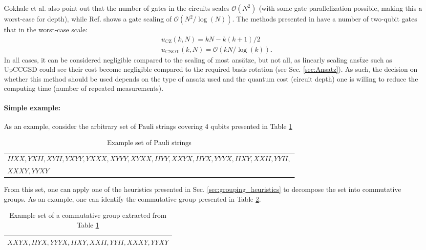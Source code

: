 Gokhale et al. \cite{Gokhale2019_long} also point out that the number of gates in the circuits scales $\mathcal{O}(N^2)$ (with some gate parallelization possible, making this a worst-case for depth), while Ref. \cite{Yen2020} shows a gate scaling of $\mathcal{O}(N^2/\log (N))$. The methods presented in \cite{Crawford2021} have a number of two-qubit gates that in the worst-case scale:
 \begin{align}
     &u_{\mathrm{CZ}}(k, N) = kN - k(k+1)/2 \nonumber \\
     &u_{\mathrm{CNOT}}(k, N) = \mathcal{O}(kN/\log(k)).
 \end{align}
In all cases, it can be considered negligible compared to the scaling of most ans{\"{a}}tze, but not all, as linearly scaling ans\"tze such as UpCCGSD \cite{Lee2019} could see their cost become negligible compared to the required basis rotation (see Sec. \ref{sec:Ansatz}). As such, the decision on whether this method should be used depends on the type of ansatz used and the quantum cost (circuit depth) one is willing to reduce the computing time (number of repeated measurements). 

\paragraph{Simple example:} As an example, consider the arbitrary set of Pauli strings covering 4 qubits presented in Table  \ref{tab:eg_pauli_set}

\begin{table} [ht]
\caption{Example set of Pauli strings}\label{tab:eg_pauli_set}
\begin{tabularx}{\textwidth}{p{\linewidth}}
\toprule
$IIXX, YXII, XYII, YXYY, YXXX, XYYY, XYXX, IIYY, XXYX, IIYX, YYYX, IIXY, XXII, YYII,$ \\ 
$XXXY, YYXY$\\
\bottomrule
\end{tabularx}
\end{table}

From this set, one can apply one of the heuristics presented in Sec. \ref{sec:grouping_heuristics} to decompose the set into commutative groups. As an example, one can identify the commutative group presented in Table  \ref{tab:eg_commutative_group}.

\begin{table} [ht]
\caption{Example set of a commutative group extracted from Table \ref{tab:eg_pauli_set}}
\begin{tabularx}{\textwidth}{p{\linewidth}}
\toprule
$XXYX, IIYX, YYYX, IIXY, XXII, YYII, XXXY, YYXY$
\\
\bottomrule
\end{tabularx}
 \label{tab:eg_commutative_group}
\end{table}

